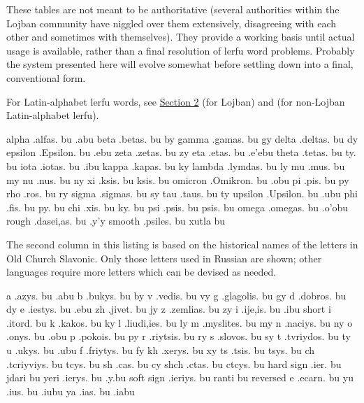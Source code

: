 These tables are not meant to be authoritative (several
    authorities within the Lojban community have niggled over them
    extensively, disagreeing with each other and sometimes with
    themselves). They provide a working basis until actual usage is
    available, rather than a final resolution of lerfu word
    problems. Probably the system presented here will evolve
    somewhat before settling down into a final, conventional
    form.

For Latin-alphabet lerfu words, see \hyperref[sec:17:2]{Section
    2} (for Lojban) and  (for
    non-Lojban Latin-alphabet lerfu).



alpha       .alfas. bu      .abu
    beta        .betas. bu      by
    gamma       .gamas. bu      gy
    delta       .deltas. bu     dy
    epsilon     .Epsilon. bu        .ebu
    zeta        .zetas. bu      zy
    eta     .etas. bu       .e'ebu
    theta       .tetas. bu      ty. bu
    iota        .iotas. bu      .ibu
    kappa       .kapas. bu      ky
    lambda      .lymdas. bu     ly
    mu      .mus. bu        my
    nu      .nus. bu        ny
    xi      .ksis. bu       ksis. bu
    omicron     .Omikron. bu        .obu
    pi      .pis. bu        py
    rho     .ros. bu        ry
    sigma       .sigmas. bu     sy
    tau     .taus. bu       ty
    upsilon     .Upsilon. bu        .ubu
    phi     .fis. bu        py. bu
    chi     .xis. bu        ky. bu
    psi     .psis. bu       psis. bu
    omega       .omegas. bu     .o'obu
    rough       .dasei,as. bu       .y'y
    smooth      .psiles. bu     xutla bu



The second column in this listing is based on the historical
    names of the letters in Old Church Slavonic. Only those letters
    used in Russian are shown; other languages require more letters
    which can be devised as needed.

   a       .azys. bu       .abu
    b       .bukys. bu      by
    v       .vedis. bu      vy
    g       .glagolis. bu       gy
    d       .dobros. bu     dy
    e       .iestys. bu     .ebu
    zh      .jivet. bu      jy
    z       .zemlias. bu        zy
    i       .ije,is. bu     .ibu
    short i                 .itord. bu
    k       .kakos. bu      ky
    l       .liudi,ies. bu      ly
    m       .myslites. bu       my
    n       .naciys. bu     ny
    o       .onys. bu       .obu
    p       .pokois. bu     py
    r       .riytsis. bu        ry
    s       .slovos. bu     sy
    t       .tvriydos. bu       ty
    u       .ukys. bu       .ubu
    f       .friytys. bu        fy
    kh      .xerys. bu      xy
    ts      .tsis. bu       tsys. bu
    ch      .tcriyviys. bu      tcys. bu
    sh      .cas. bu        cy
    shch        .ctas. bu       ctcys. bu
    hard sign   .ier. bu        jdari bu
    yeri        .ierys. bu      .y.bu
    soft sign   .ieriys. bu     ranti bu
    reversed e              .ecarn. bu
    yu      .ius. bu        .iubu
    ya      .ias. bu        .iabu



